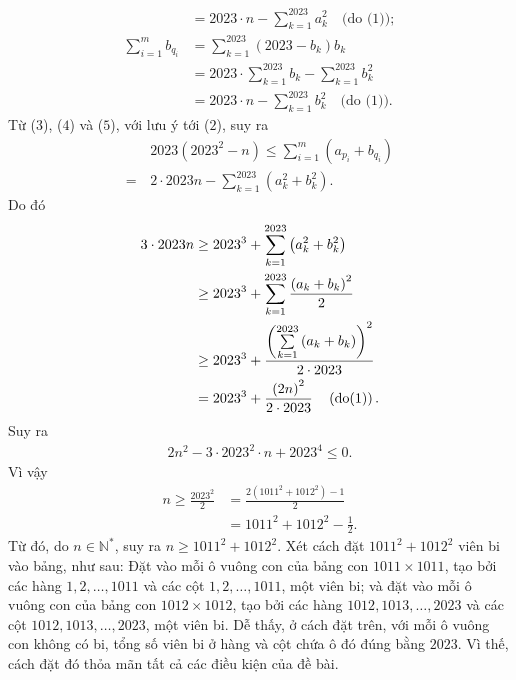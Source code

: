 \begin{multicols}{2}
\begin{align*}
		&= 2023 \cdot n - \sum\limits_{k = 1}^{2023} {a_k^2} \quad\text{(do ($1$))}; \tag{$4$}\\
		\sum\limits_{i = 1}^m {{b_{{q_i}}}}  &= \sum\limits_{k = 1}^{2023} {\left( {2023 - {b_k}} \right){b_k}}  \\
		&= 2023 \cdot \sum\limits_{k = 1}^{2023} {{b_k}}  - \sum\limits_{k = 1}^{2023} {b_k^2}  \\
		&= 2023 \cdot n - \sum\limits_{k = 1}^{2023} {b_k^2} \quad\text{(do ($1$))}. \tag{$5$}
	\end{align*}
	Từ ($3$), ($4$) và ($5$), với lưu ý tới ($2$), suy ra
	\begin{align*}
		&2023\left( {{{2023}^2} - n} \right) \le \sum\limits_{i = 1}^m {\left( {{a_{{p_i}}} + {b_{{q_i}}}} \right)}  \\
		= \,&2 \cdot 2023n - \sum\limits_{k = 1}^{2023} {\left( {a_k^2 + b_k^2} \right)} .
	\end{align*}
	Do đó
	\begin{align*}
			3 \cdot 2023n &\ge {2023^3} + \sum\limits_{k = 1}^{2023} {\left( {a_k^2 + b_k^2} \right)}  \\
			&\ge {2023^3} + \sum\limits_{k = 1}^{2023} {\frac{{{{\left( {{a_k} + {b_k}} \right)}^2}}}{2}} \\
			 &\ge {2023^3} + \frac{{{{\left( {\sum\limits_{k = 1}^{2023} {\left( {{a_k} + {b_k}} \right)} } \right)}^2}}}{{2 \cdot 2023}} \\
			 &= {2023^3} + \frac{{{{\left( {2n} \right)}^2}}}{{2 \cdot 2023}} \quad\left( {{\rm{do}}(1)} \right).
	\end{align*}
	Suy ra
	\begin{align*}
		2{n^2} - 3 \cdot {2023^2} \cdot n + {2023^4} \le 0.
	\end{align*}
	Vì vậy
	\begin{align*}
		n \ge \frac{{{{2023}^2}}}{2} &= \frac{{2\left( {{{1011}^2} + {{1012}^2}} \right) - 1}}{2} \\
		&= {1011^2} + {1012^2} - \frac{1}{2}.
	\end{align*}
	Từ đó, do $n \in \mathbb{N^*}$,  suy ra  $n \ge {1011^2} + {1012^2}$.
	\vskip 0.05cm
	Xét cách đặt $1011^2 + 1012^2$  viên bi vào bảng, như sau:
	\vskip 0.05cm
	Đặt vào mỗi ô vuông con của bảng con $1011 \times 1011$, tạo bởi các hàng $1, 2, \ldots, 1011$ và các cột $1, 2, \ldots, 1011$, một viên bi; và đặt vào mỗi ô vuông con của bảng con $1012 \times 1012$, tạo bởi các hàng $1012, 1013, \ldots, 2023$ và các cột $1012, 1013, \ldots, 2023$, một viên bi.
	\vskip 0.05cm
	Dễ thấy, ở cách đặt trên, với mỗi ô vuông con không có bi, tổng số viên bi ở hàng và cột chứa ô đó đúng bằng $2023$. Vì thế, cách đặt đó thỏa mãn tất cả các điều kiện của đề bài.

\end{multicols}
